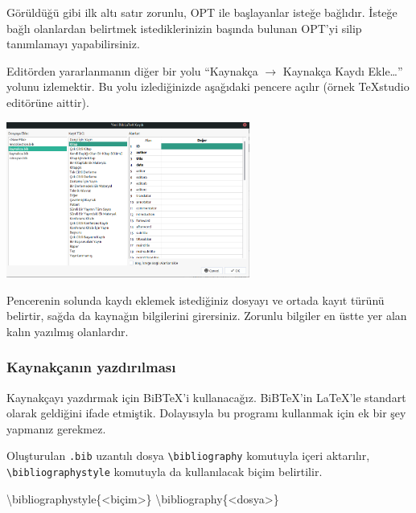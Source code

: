 \documentclass[
  10pt,
]{scrbook}
\newenvironment{Shaded}{\begin{snugshade}}{\end{snugshade}}
\newcommand{\BuiltInTok}[1]{#1}
\newcommand{\ExtensionTok}[1]{#1}
\newcommand{\NormalTok}[1]{#1}
\theoremstyle{definition}
\theoremstyle{definition}
\theoremstyle{definition}
\theoremstyle{definition}
\theoremstyle{remark}
\begin{document}
Görüldüğü gibi ilk altı satır zorunlu, OPT ile başlayanlar
isteğe bağlıdır. İsteğe bağlı olanlardan belirtmek istediklerinizin
başında bulunan OPT'yi silip tanımlamayı yapabilirsiniz.

Editörden yararlanmanın diğer bir yolu ``Kaynakça \(\rightarrow\)
Kaynakça Kaydı Ekle\ldots{}'' yolunu izlemektir. Bu yolu izlediğinizde
aşağıdaki pencere açılır (örnek TeXstudio editörüne aittir).

\includegraphics[width=0.6\textwidth,height=\textheight]{images/tex-studio.png}

Pencerenin solunda kaydı eklemek istediğiniz dosyayı ve ortada kayıt
türünü belirtir, sağda da kaynağın bilgilerini girersiniz. Zorunlu
bilgiler en üstte yer alan kalın yazılmış olanlardır.

\hypertarget{kaynakuxe7anux131n-yazdux131rux131lmasux131}{%
\subsubsection{Kaynakçanın yazdırılması}\label{kaynakuxe7anux131n-yazdux131rux131lmasux131}}

Kaynakçayı yazdırmak için BiBTeX'i kullanacağız. BiBTeX'in LaTeX'le
standart olarak geldiğini ifade etmiştik. Dolayısıyla bu programı
kullanmak için ek bir şey yapmanız gerekmez.

Oluşturulan \texttt{.bib} uzantılı dosya \texttt{\textbackslash{}bibliography} komutuyla içeri
aktarılır, \texttt{\textbackslash{}bibliographystyle} komutuyla da kullanılacak biçim
belirtilir.

\begin{Shaded}
\begin{Highlighting}[]
\BuiltInTok{\textbackslash{}bibliographystyle}\NormalTok{\{}\ExtensionTok{\textless{}biçim\textgreater{}}\NormalTok{\}}
\BuiltInTok{\textbackslash{}bibliography}\NormalTok{\{}\ExtensionTok{\textless{}dosya\textgreater{}}\NormalTok{\}}
\end{Highlighting}
\end{Shaded}
\end{document}
